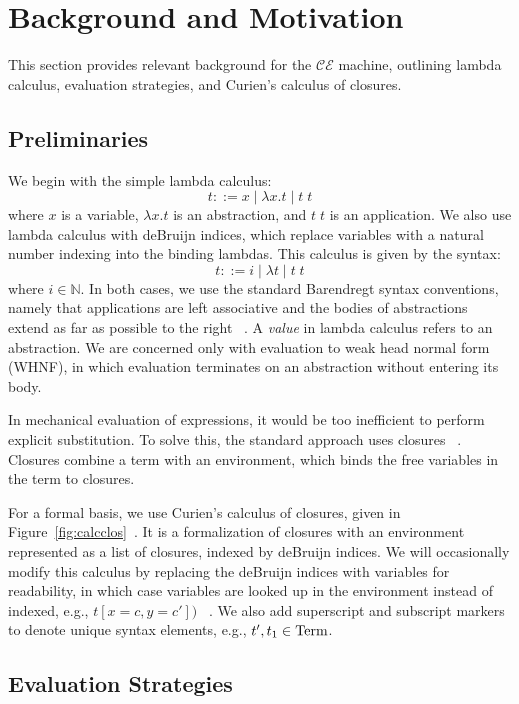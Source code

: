 \section{Background and Motivation} \label{sec:back}

This section provides relevant background for the $\mathcal{CE}$ machine,
outlining lambda calculus, evaluation strategies, and Curien's calculus of
closures.

\subsection{Preliminaries}

We begin with the simple lambda calculus:  $$ t::= x \; | \;  \lambda x.t \; |
\;  t \; t $$ where $x$ is a variable, $\lambda x.t$ is an abstraction, and $t
\; t$ is an application. We also use lambda calculus with deBruijn indices,
which replace variables with a natural number indexing into the binding lambdas.
This calculus is given by the syntax: $$ t::= i \; | \; \lambda t \; | \; t \; t
$$ where $i \in \mathbb{N}$. In both cases, we use the standard Barendregt
syntax conventions, namely that applications are left associative and the bodies
of abstractions extend as far as possible to the right
~\cite{barendregt1984lambda}.  A \emph{value} in lambda calculus refers to an
abstraction. We are concerned only with evaluation to weak head normal form
(WHNF), in which evaluation terminates on an abstraction without entering its
body.

In mechanical evaluation of expressions, it would be too inefficient to perform
explicit substitution. To solve this, the standard approach uses closures
~\cite{landin1964mechanical,curien1991abstract,jonesstg,biernacka2007concrete}.
Closures combine a term with an environment, which binds the free variables in
the term to closures. 

For a formal basis, we use Curien's calculus of closures, given in
Figure~\ref{fig:calcclos}~\cite{curien1991abstract}.  It is a formalization of
closures with an environment represented as a list of closures, indexed by
deBruijn indices. We will occasionally modify this calculus by replacing the
deBruijn indices with variables for readability, in which case variables are
looked up in the environment instead of indexed, e.g., $t[x = c, y = c'])$
~\cite{barendregt1984lambda}. We also add superscript and subscript markers to
denote unique syntax elements, e.g., $t', t_1 \in \textnormal{Term}$. 

\subsection{Evaluation Strategies} \label{sec:eval}

